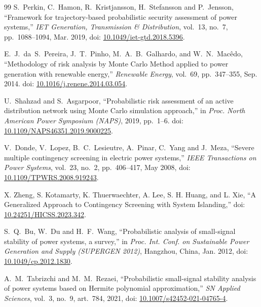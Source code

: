 \documentclass[journal]{IEEEtran}
\begin{document}
\begin{thebibliography}{99}
S.~Perkin, C.~Hamon, R.~Kristjansson, H.~Stefansson and P.~Jensson,
``Framework for trajectory-based probabilistic security assessment of power systems,''
\emph{IET Generation, Transmission \& Distribution}, 
vol.~13, no.~7, pp.~1088--1094, Mar. 2019,
doi: \href{https://doi.org/10.1049/iet-gtd.2018.5396}{10.1049/iet-gtd.2018.5396}.

E.~J.~da~S.~Pereira, J.~T.~Pinho, M.~A.~B.~Galhardo, and W.~N.~Macêdo,
``Methodology of risk analysis by Monte Carlo Method applied to power generation with renewable energy,''
\emph{Renewable Energy}, vol.~69, pp.~347--355, Sep. 2014.
doi: \href{http://dx.doi.org/10.1016/j.renene.2014.03.054}{10.1016/j.renene.2014.03.054}.

U.~Shahzad and S.~Asgarpoor,
``Probabilistic risk assessment of an active distribution network using Monte Carlo simulation approach,''
in \emph{Proc. North American Power Symposium (NAPS)}, 2019, pp.~1--6.
doi: \href{https://doi.org/10.1109/NAPS46351.2019.9000225}{10.1109/NAPS46351.2019.9000225}.

V.~Donde, V.~Lopez, B.~C.~Lesieutre, A.~Pinar, C.~Yang and J.~Meza,
``Severe multiple contingency screening in electric power systems,''
\emph{IEEE Transactions on Power Systems}, 
vol.~23, no.~2, pp.~406--417, May 2008,
doi: \href{https://doi.org/10.1109/TPWRS.2008.919243}{10.1109/TPWRS.2008.919243}.

X. Zheng, S. Kotamarty, K. Thuerwaechter, A. Lee, S. H. Huang, and L. Xie,
``A Generalized Approach to Contingency Screening with System Islanding,''
doi: \href{https://hdl.handle.net/10125/102973}{10.24251/HICSS.2023.342}.

S.~Q.~Bu, W.~Du and H.~F.~Wang,
``Probabilistic analysis of small-signal stability of power systems, a survey,''
in \emph{Proc. Int. Conf. on Sustainable Power Generation and Supply (SUPERGEN 2012)}, 
Hangzhou, China, Jan. 2012,
doi: \href{https://www.researchgate.net/publication/261020926_Probabilistic_analysis_of_small-signal_stability_of_power_systems_-_A_survey}{10.1049/cp.2012.1830}.

A.~M.~Tabrizchi and M.~M.~Rezaei,
``Probabilistic small-signal stability analysis of power systems based on Hermite polynomial approximation,''
\emph{SN Applied Sciences}, 
vol.~3, no.~9, art.~784, 2021,
doi: \href{https://doi.org/10.1007/s42452-021-04765-4}{10.1007/s42452-021-04765-4}.


\end{thebibliography}
\end{document}
